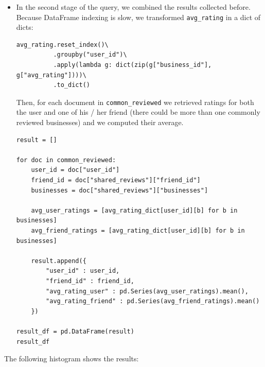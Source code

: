 \documentclass{Configuration_Files/PoliMi3i_thesis}
\begin{document}
\begin{itemize}
\bigskip

\item In the second stage of the query, we combined the results collected before. Because DataFrame indexing is slow, we transformed \texttt{avg\_rating} in a dict of dicts:

\bigskip 

\begin{verbatim}
avg_rating.reset_index()\
          .groupby("user_id")\
          .apply(lambda g: dict(zip(g["business_id"], g["avg_rating"])))\
          .to_dict()
\end{verbatim}

\bigskip

Then, for each document in \texttt{common\_reviewed} we retrieved ratings for both the user and one of his / her friend (there could be more than one commonly reviewed businesses) and we computed their average. 
\bigskip 

\begin{verbatim}
result = []

for doc in common_reviewed:
    user_id = doc["user_id"]
    friend_id = doc["shared_reviews"]["friend_id"]
    businesses = doc["shared_reviews"]["businesses"]
    
    avg_user_ratings = [avg_rating_dict[user_id][b] for b in businesses]
    avg_friend_ratings = [avg_rating_dict[user_id][b] for b in businesses]
    
    result.append({
        "user_id" : user_id,
        "friend_id" : friend_id,
        "avg_rating_user" : pd.Series(avg_user_ratings).mean(),
        "avg_rating_friend" : pd.Series(avg_friend_ratings).mean()
    })
    
result_df = pd.DataFrame(result)
result_df
\end{verbatim}

\bigskip

\end{itemize}

The following histogram shows the results:

\bigskip
\end{document}
